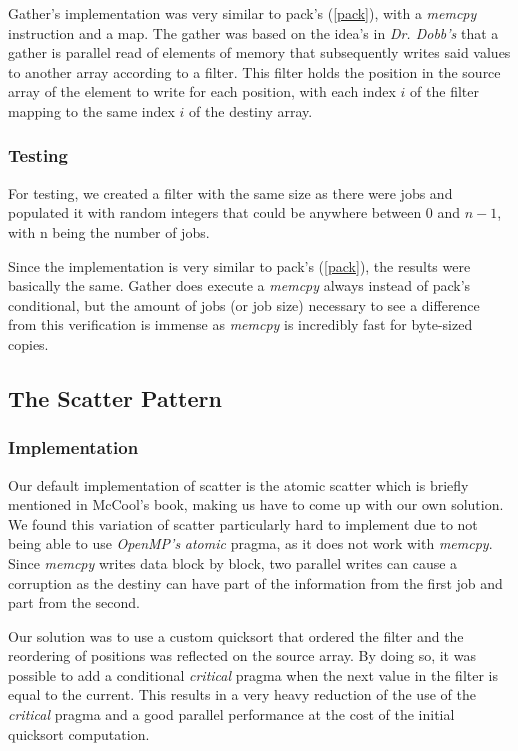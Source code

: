 \documentclass[9pt,journal]{IEEEtran}
\begin{document}
Gather's implementation was very similar to pack's (\ref{pack}), with a \textit{memcpy} instruction and a map. The gather was based on the idea's in \textit{Dr. Dobb's} that a gather is parallel read of elements of memory that subsequently writes said values to another array according to a filter. This filter holds the position in the source array of the element to write for each position, with each index $ i $ of the filter mapping to the same index $ i $ of the destiny array.

\subsubsection{Testing}

For testing, we created a filter with the same size as there were jobs and populated it with random integers that could be anywhere between 0 and $ n - 1 $, with n being the number of jobs.

Since the implementation is very similar to pack's (\ref{pack}), the results were basically the same. Gather does execute a \textit{memcpy} always instead of pack's conditional, but the amount of jobs (or job size) necessary to see a difference from this verification is immense as \textit{memcpy} is incredibly fast for byte-sized copies.

\subsection{The Scatter Pattern}
\label{scatter}

\subsubsection{Implementation}

Our default implementation of scatter is the atomic scatter which is briefly mentioned in McCool's book, making us have to come up with our own solution. We found this variation of scatter particularly hard to implement due to not being able to use \textit{OpenMP's} \textit{atomic} pragma, as it does not work with \textit{memcpy}. Since \textit{memcpy} writes data block by block, two parallel writes can cause a corruption as the destiny can have part of the information from the first job and part from the second.

Our solution was to use a custom quicksort that ordered the filter and the reordering of positions was reflected on the source array. By doing so, it was possible to add a conditional \textit{critical} pragma when the next value in the filter is equal to the current. This results in a very heavy reduction of the use of the \textit{critical} pragma and a good parallel performance at the cost of the initial quicksort computation.
\end{document}
